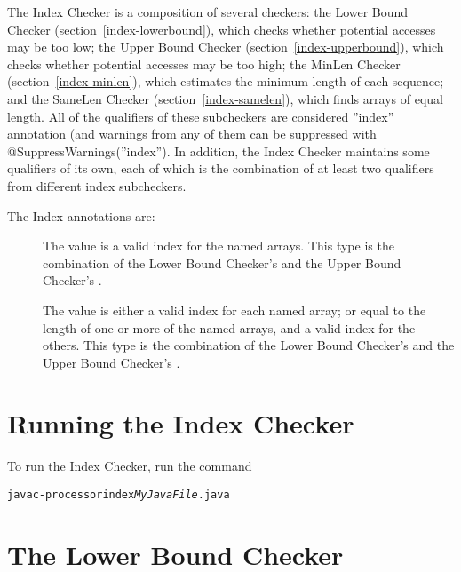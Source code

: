 The Index Checker is a composition of several checkers: the Lower
Bound Checker (section~\ref{index-lowerbound}), which checks whether
potential accesses may be too low; the Upper Bound Checker
(section~\ref{index-upperbound}), which checks whether potential
accesses may be too high; the MinLen Checker
(section~\ref{index-minlen}), which estimates the minimum length of
each sequence; and the SameLen Checker (section~\ref{index-samelen}),
which finds arrays of equal length. All of the qualifiers of these
subcheckers are considered ''index'' annotation (and warnings from any
of them can be suppressed with @SuppressWarnings(''index''). In
addition, the Index Checker maintains some qualifiers of its own, each
of which is the combination of at least two qualifiers from different
index subcheckers.

The Index annotations are:
\begin{description}
\item[]
  The value is a valid index for the named arrays. This type is the combination
  of the Lower Bound Checker's
   and the Upper Bound
  Checker's .
 \item[]
   The value is either a valid index for each named array; or equal to the
   length of one or more of the named arrays, and a valid index for the
   others. This type is the combination of the Lower Bound Checker's
   and the Upper Bound
  Checker's
  .
\end{description}

\section{Running the Index Checker\label{index-running}}

To run the Index Checker, run the command

\begin{alltt}
  javac -processor index \emph{MyJavaFile}.java
\end{alltt}

\section{The Lower Bound Checker\label{index-lowerbound}}

